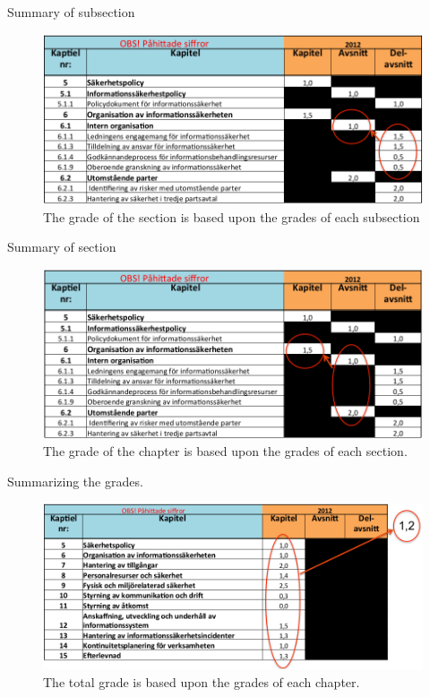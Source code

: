 \documentclass{beamer}
\begin{document}
\begin{frame}{Summary of subsection}
  \begin{figure}
    \includegraphics[width=\textwidth]{gap-sammanstallning.png}
    \caption{The grade of the section is based upon the grades of each subsection}
  \end{figure}
\end{frame}

\begin{frame}{Summary of section}
  \begin{figure}
    \includegraphics[width=\textwidth]{gap-kapitel.png}
    \caption{The grade of the chapter is based upon the grades of each section.}
  \end{figure}
\end{frame}

\begin{frame}{Summarizing the grades.}
  \begin{figure}
    \includegraphics[width=\textwidth]{gap-betyg.png}
    \caption{The total grade is based upon the grades of each chapter.}
  \end{figure}
\end{frame}
\end{document}
